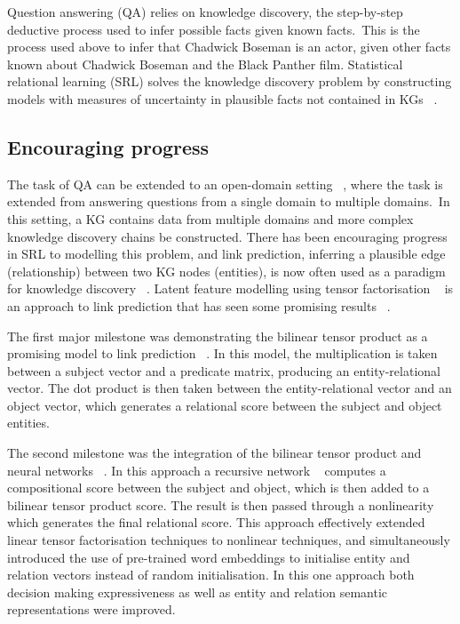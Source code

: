 \noindent Question answering (QA) relies on knowledge discovery, the step-by-step deductive process used to infer possible facts given known facts.\ This is the process used above to infer that Chadwick Boseman is an actor, given other facts known about Chadwick Boseman and the Black Panther film. Statistical relational learning (SRL) solves the knowledge discovery problem by constructing models with measures of uncertainty in plausible facts not contained in KGs \unskip~\citep{koller2007introduction}.\par

\subsection{Encouraging progress} 

The task of QA can be extended to an open-domain setting \unskip~\citep{chen2017reading}, where the task is extended from answering questions from a single domain to multiple domains.\ In this setting, a KG contains data from multiple domains and more complex knowledge discovery chains be constructed. There has been encouraging progress in SRL to modelling this problem, and link prediction, inferring a plausible edge (relationship) between two KG nodes (entities), is now often used as a paradigm for knowledge discovery \unskip 
~\citep{kristiadi2019incorporating, ebisu2018toruse,nguyen2017novel}. Latent feature modelling using tensor factorisation \unskip~\citep{harshman1978models, kolda2009tensor} is an approach to link prediction that has seen some promising results \unskip ~\citep{bordes2011learning, jenatton2012latent, nickel2016holographic}. \par 

\noindent The first major milestone was demonstrating the bilinear tensor product as a promising model to link prediction \unskip~\citep{nickel2011three}. In this model, the multiplication is taken between a subject vector and a predicate matrix, producing an entity-relational vector. The dot product is then taken between the entity-relational vector and an object vector, which generates a relational score between the subject and object entities. \par

\noindent The second milestone was the integration of the bilinear tensor product and neural networks \unskip~\citep{socher2013reasoning}. In this approach a recursive network \unskip~\citep{pollack1990recursive} computes a compositional score between the subject and object, which is then added to a bilinear tensor product score. The result is then passed through a nonlinearity which generates the final relational score. This approach effectively extended linear tensor factorisation techniques to nonlinear techniques, and simultaneously introduced the use of pre-trained word embeddings to initialise entity and relation vectors instead of random initialisation. In this one approach both decision making expressiveness as well as entity and relation semantic representations were improved. \par

